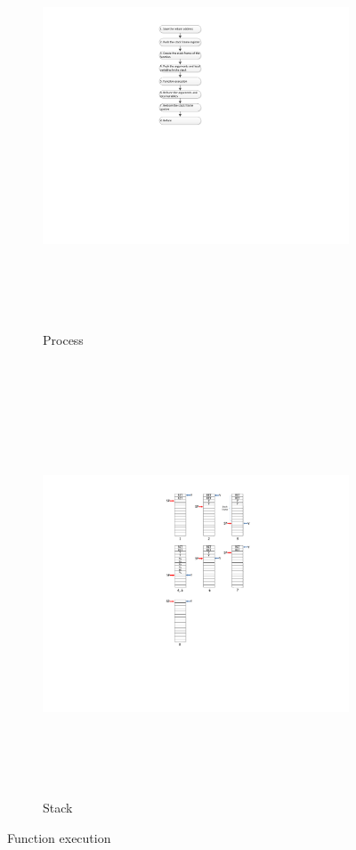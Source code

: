 \begin{figure}
        \centering
        \begin{subfigure}[b]{0.5\columnwidth}
                \includegraphics[width=\textwidth, height=12cm]{figures/original_function_operations_process_v1}
                \caption{Process}
                \label{fig:original_function_operation_process}
        \end{subfigure}~
        \begin{subfigure}[b]{0.5\columnwidth}
                \includegraphics[width=\textwidth, height=12cm]{figures/original_function_operations_stack_v1}
                \caption{Stack}
                \label{fig:original_function_operation_stack}
        \end{subfigure}
        \caption{Function execution}\label{fig:original_function_operation}
\end{figure}

 